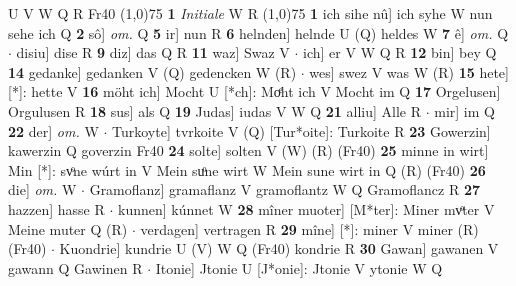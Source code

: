 \documentclass[8pt,a4paper,notitlepage]{article}
\begin{document}
\begin{table}[ht]
\begin{minipage}[t]{0.5\linewidth}
U V W Q R Fr40 \newline
\line(1,0){75} \newline
\textbf{1} \textit{Initiale} W R  \newline
\line(1,0){75} \newline
\textbf{1} ich sihe nû] ich syhe W nun sehe ich Q \textbf{2} sô] \textit{om.} Q \textbf{5} ir] nun R \textbf{6} helnden] helnde U (Q) heldes W \textbf{7} ê] \textit{om.} Q  $\cdot$ disiu] dise R \textbf{9} diz] das Q R \textbf{11} waz] Swaz V  $\cdot$ ich] er V W Q R \textbf{12} bin] bey Q \textbf{14} gedanke] gedanken V (Q) gedencken W (R)  $\cdot$ wes] swez V was W (R) \textbf{15} hete] [*]: hette V \textbf{16} möht ich] Mocht U [*ch]: Moͤht ich V Mocht im Q \textbf{17} Orgelusen] Orgulusen R \textbf{18} sus] als Q \textbf{19} Judas] iudas V W Q \textbf{21} alliu] Alle R  $\cdot$ mir] im Q \textbf{22} der] \textit{om.} W  $\cdot$ Turkoyte] tvrkoite V (Q) [Tur*oite]: Turkoite  R \textbf{23} Gowerzin] kawerzin Q goverzin Fr40 \textbf{24} solte] solten V (W) (R) (Fr40) \textbf{25} minne in wirt] Min [*]: svͦne wúrt in V Mein suͦne wirt W Mein sune wirt in Q (R) (Fr40) \textbf{26} die] \textit{om.} W  $\cdot$ Gramoflanz] gramaflanz V gramoflantz W Q Gramoflancz R \textbf{27} hazzen] hasse R  $\cdot$ kunnen] kúnnet W \textbf{28} mîner muoter] [M*ter]: Miner mvͦter V Meine muter Q (R)  $\cdot$ verdagen] vertragen R \textbf{29} mîne] [*]: miner V miner (R) (Fr40)  $\cdot$ Kuondrie] kundrie U (V) W Q (Fr40) kondrie R \textbf{30} Gawan] gawanen V gawann Q Gawinen R  $\cdot$ Itonie] Jtonie U [J*onie]: Jtonie V ytonie W Q \newline
\end{minipage}
\end{table}
\end{document}
